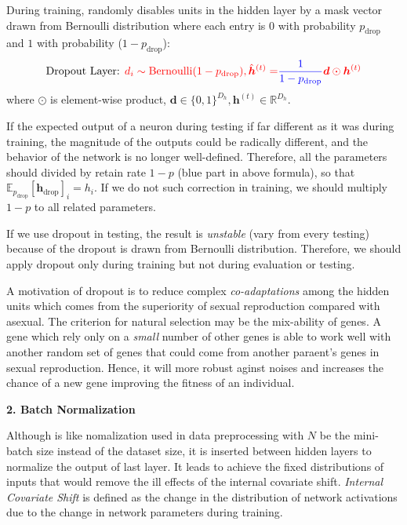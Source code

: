 During training,   randomly disables units in the hidden layer by a mask vector drawn from Bernoulli distribution where each entry is $0$ with probability $p_{\text{drop}}$ and $1$ with probability ($1 - p_{\text{drop}}$):
\begin{equation}
\text{Dropout Layer: } \textcolor{red}{d_i \sim \text{Bernoulli}(1 - p_{\text{drop}}), \hat{\bm{h}}^{(t)} = } \textcolor{blue}{\frac{1}{1-p_{\text{drop}}}} \textcolor{red}{\bm{d} \odot \bm{h}^{(t)}}
\end{equation}
where $\odot$ is element-wise product, $\bm{d} \in \{0, 1\}^{D_h}, \bm{h}^{(t)} \in \mathbb{R}^{D_h}$.

If the expected output of a neuron during testing if far different as it was during training, the magnitude of the outputs could be radically different, and the behavior of the network is no longer well-defined.
Therefore, all the parameters should divided by retain rate $1-p$ (blue part in above formula), so that $\mathbb{E}_{p_{\text{drop}}} [\bm{h}_{\text{drop}}]_i = h_i$.
If we do not such correction in training, we should multiply $1-p$ to all related parameters.

If we use dropout in testing, the result is \emph{unstable} (vary from every testing) because of the
dropout is drawn from Bernoulli distribution.
Therefore, we should apply dropout only during training but not during evaluation or testing.

A motivation of dropout is to reduce complex \emph{co-adaptations} among the hidden units which comes from the superiority of sexual reproduction compared with asexual.
The criterion for natural selection may be the mix-ability of genes.
A gene which rely only on a \emph{small} number of other genes is able to work well with another random set of genes that could come from another paraent's genes in sexual reproduction.
Hence, it will more robust aginst noises and increases the chance of a new gene improving the fitness of an individual.

\textbf{2. Batch Normalization}

Although   is like nomalization used in data preprocessing with $N$ be the mini-batch size instead of the dataset size, it is inserted between hidden layers to normalize the output of last layer.
It leads to achieve the fixed distributions of inputs that would remove the ill effects of the internal covariate shift.
\emph{Internal Covariate Shift} is defined as the change in the distribution of network activations due to the change in network parameters during training.

